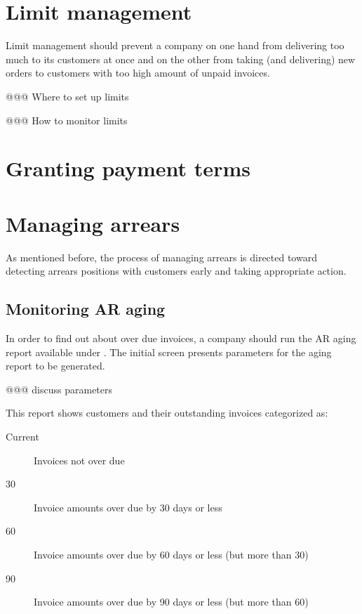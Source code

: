\section{Limit management}
\label{sec-business-processes-credit-risk-limit-management}

Limit management should prevent a company on one hand from delivering too much
to its customers at once and on the other from taking (and delivering) new orders
to customers with too high amount of unpaid invoices.



@@@ Where to set up limits

@@@ How to monitor limits



\section{Granting payment terms}
\label{sec-business-processes-credit-risk-payment-terms}

\section{Managing arrears}
\label{sec-business-processes-credit-risk-managing-arrears}

As mentioned before, the process of managing arrears is directed toward
detecting arrears positions with customers early and taking appropriate
action.


\subsection{Monitoring AR aging}
\label{subsec-business-processes-credit-risk-monitoring-arrears}

In order to find out about over due invoices, a company should run the AR
aging report available under .
The initial screen presents parameters for the aging report to be generated.

@@@ discuss parameters

This report shows customers and their outstanding invoices categorized as:

\begin{description}
\item [Current] Invoices not over due
\item [30] Invoice amounts over due by 30 days or less
\item [60] Invoice amounts over due by 60 days or less (but more than 30)
\item [90] Invoice amounts over due by 90 days or less (but more than 60)
\end{description}


